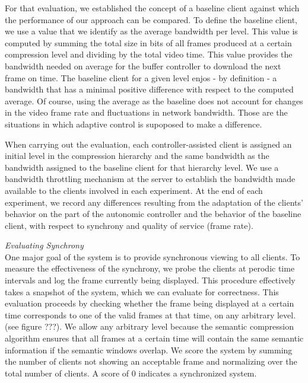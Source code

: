 \documentclass{sig-alternate}
\begin{document}
For that evaluation, we established the concept of a baseline client against which the 
performance of our approach can be compared. 
To define the
baseline client, we use a value that we identify as the average
bandwidth per level. This value is computed by summing the total size in bits
of all frames produced at a certain compression level and dividing by the total video
time.  This value provides the bandwidth needed on average for the
buffer controller to download the next frame on time. 
The baseline client for a given level enjos - by definition - a bandwidth that 
has a minimal positive difference with respect to the computed average. 
Of course, using the  average as the baseline does not account for changes in the video
frame rate and fluctuations in network bandwidth. Those are the situations in which
adaptive control is supoposed to make a difference. 

When carrying out the evaluation, 
each controller-assisted client is assigned an initial level in the compression hierarchy and
the same bandwidth as the bandwidth assigned to the baseline client for that hierarchy level.
We use a bandwidth throttling mechanism \cite{SHAPERD} at the server to establish
the bandwidth made available to the clients involved in each experiment.
At the end of each experiment, we record any differences
resulting from the adaptation of the clients' 
behavior on the part of the autonomic controller and the behavior 
of the baseline client, with respect to synchrony and quality of service (frame rate).

 

\textit{Evaluating Synchrony} \\ One major goal of the system is to
provide synchronous viewing to all clients.  To measure the
effectiveness of the synchrony, we probe the clients at perodic time
intervals and log the frame currently being displayed.  This procedure
effectively takes a snapshot of the system, which we can evaluate for
correctness.  This evaluation proceeds by checking whether the frame
being displayed at a certain time corresponds to one of the valid
frames at that time, on any arbitrary level.  (see figure ???).  We allow
any arbitrary level because the semantic compression algorithm ensures
that all frames at a certain time will contain the same semantic
information if the semantic windows overlap.  We score the system by
summing the number of clients not showing an acceptable frame and
normalizing over the total number of clients.  A score of 0 indicates
a synchronized system.
\end{document}
